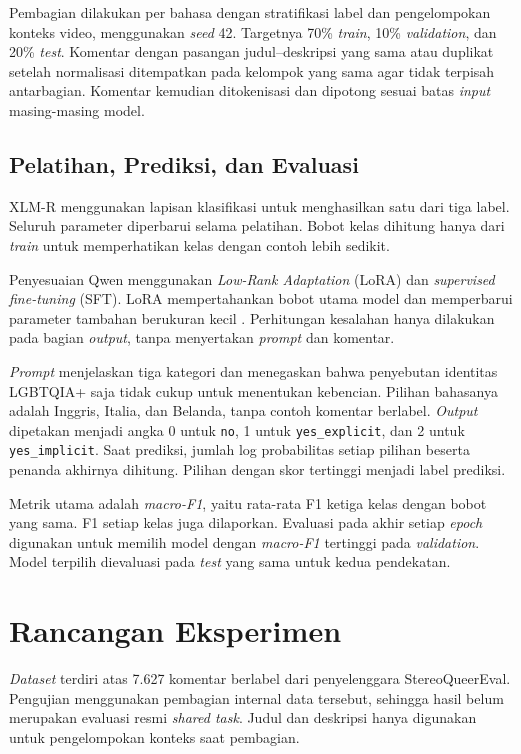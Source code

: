 \documentclass[11pt]{article}
\begin{document}
Pembagian dilakukan per bahasa dengan stratifikasi label dan pengelompokan konteks video, menggunakan \textit{seed} 42. Targetnya 70\% \textit{train}, 10\% \textit{validation}, dan 20\% \textit{test}. Komentar dengan pasangan judul--deskripsi yang sama atau duplikat setelah normalisasi ditempatkan pada kelompok yang sama agar tidak terpisah antarbagian. Komentar kemudian ditokenisasi dan dipotong sesuai batas \textit{input} masing-masing model.

\subsection{Pelatihan, Prediksi, dan Evaluasi}
XLM-R menggunakan lapisan klasifikasi untuk menghasilkan satu dari tiga label. Seluruh parameter diperbarui selama pelatihan. Bobot kelas dihitung hanya dari \textit{train} untuk memperhatikan kelas dengan contoh lebih sedikit.

Penyesuaian Qwen menggunakan \textit{Low-Rank Adaptation} (LoRA) dan \textit{supervised fine-tuning} (SFT). LoRA mempertahankan bobot utama model dan memperbarui parameter tambahan berukuran kecil \citep{hu-etal-2021-lora}. Perhitungan kesalahan hanya dilakukan pada bagian \textit{output}, tanpa menyertakan \textit{prompt} dan komentar.

\textit{Prompt} menjelaskan tiga kategori dan menegaskan bahwa penyebutan identitas LGBTQIA+ saja tidak cukup untuk menentukan kebencian. Pilihan bahasanya adalah Inggris, Italia, dan Belanda, tanpa contoh komentar berlabel. \textit{Output} dipetakan menjadi angka 0 untuk \texttt{no}, 1 untuk \texttt{yes\_explicit}, dan 2 untuk \texttt{yes\_implicit}. Saat prediksi, jumlah log probabilitas setiap pilihan beserta penanda akhirnya dihitung. Pilihan dengan skor tertinggi menjadi label prediksi.

Metrik utama adalah \textit{macro-F1}, yaitu rata-rata F1 ketiga kelas dengan bobot yang sama. F1 setiap kelas juga dilaporkan. Evaluasi pada akhir setiap \textit{epoch} digunakan untuk memilih model dengan \textit{macro-F1} tertinggi pada \textit{validation}. Model terpilih dievaluasi pada \textit{test} yang sama untuk kedua pendekatan.

\section{Rancangan Eksperimen}
\textit{Dataset} terdiri atas 7.627 komentar berlabel dari penyelenggara StereoQueerEval. Pengujian menggunakan pembagian internal data tersebut, sehingga hasil belum merupakan evaluasi resmi \textit{shared task}. Judul dan deskripsi hanya digunakan untuk pengelompokan konteks saat pembagian.
\end{document}
